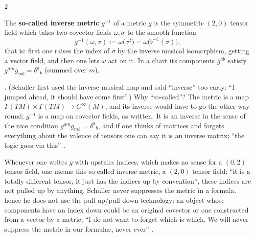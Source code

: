 \begin{paracol}{2}
\begin{definition}\label{def:c10-inverse}
The \textbf{so-called inverse metric} $g^{-1}$ of a metric $g$ is the symmetric $(2,0)$ tensor field which takes two covector fields $\omega,\sigma$ to the smooth function
\[
  g^{-1}(\omega,\sigma):=\omega\bigl(\sigma^\sharp\bigr)=\omega\bigl(\flat^{-1}(\sigma)\bigr),
\]
that is: first one raises the index of $\sigma$ by the inverse musical isomorphism, getting a vector field, and then one lets $\omega$ act on it. In a chart its components $g^{ab}$ satisfy $g^{am}g_{mb}=\delta^a{}_b$ (summed over $m$).
\end{definition}
.
(Schuller first used the inverse musical map and said ``inverse'' too early: ``I jumped ahead, it should have come first''.) Why ``so-called''? The metric is a map $\Gamma(TM)\times\Gamma(TM)\to C^\infty(M)$, and its inverse would have to go the other way round; $g^{-1}$ is a map on covector fields, as written. It is an inverse in the sense of the nice condition $g^{am}g_{mb}=\delta^a{}_b$, and if one thinks of matrices and forgets everything about the valence of tensors one can say it is an inverse matrix; ``the logic goes via this''
.
\begin{coursenote}
Whenever one writes $g$ with upstairs indices, which makes no sense for a $(0,2)$ tensor field, one means this so-called inverse metric, a $(2,0)$ tensor field; ``it is a totally different tensor, it just has the indices up by convention'', these indices are not pulled up by anything. Schuller never suppresses the metric in a formula, hence he does not use the pull-up/pull-down technology: an object whose components have an index down could be an original covector or one constructed from a vector by a metric; ``I do not want to forget which is which. We will never suppress the metric in our formulae, never ever''
.
\end{coursenote}


\end{paracol}
